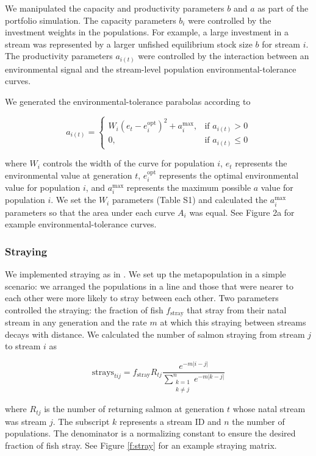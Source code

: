 We manipulated the capacity and productivity parameters $b$ and $a$ as part of the portfolio simulation. The capacity parameters $b_i$ were controlled by the investment weights in the populations. For example, a large investment in a stream was represented by a larger unfished equilibrium stock size $b$ for stream $i$. The productivity parameters $a_{i(t)}$ were controlled by the interaction between an environmental signal and the stream-level population environmental-tolerance curves.

We generated the environmental-tolerance parabolas according to

\[a_{i(t)} =
  \begin{cases}
    W_i (e_t - e_i^{\mathrm{opt}})^2 + a_i^{\mathrm{max}},
      & \text{if } a_{i(t)} > 0\\
      0, & \text{if } a_{i(t)} \leq 0
  \end{cases}\]

\noindent where $W_i$ controls the width of the curve for population $i$, $e_t$ represents the environmental value at generation $t$, $e_i^{\mathrm{opt}}$ represents the optimal environmental value for population $i$, and $a_i^{\mathrm{max}}$ represents the maximum possible $a$ value for population $i$. We set the $W_i$ parameters (Table S1) and calculated the $a_i^{\mathrm{max}}$ parameters so that the area under each curve $A_i$ was equal. See Figure 2a for example environmental-tolerance curves.

\subsubsection{Straying}

We implemented straying as in \citet{cooper1999}. We set up the metapopulation in a simple scenario: we arranged the populations in a line and those that were nearer to each other were more likely to stray between each other. Two parameters controlled the straying: the fraction of fish $f_{\mathrm{stray}}$ that stray from their natal stream in any generation and the rate $m$ at which this straying between streams decays with distance. We calculated the number of salmon straying from stream $j$ to stream $i$ as

\[\mathrm{strays}_{tij} = f_{\mathrm{stray}} R_{tj}
    \frac{e^{-m \lvert i-j \rvert }}
      {\displaystyle\sum\limits_{
        \substack{k = 1 \\ k \neq j}}^{n} 
        e^{-m \lvert k-j \rvert }}\]

\noindent where $R_{tj}$ is the number of returning salmon at generation $t$ whose natal stream was stream $j$. The subscript $k$ represents a stream ID and $n$ the number of populations. The denominator is a normalizing constant to ensure the desired fraction of fish stray. See Figure \ref{f:stray} for an example straying matrix.

